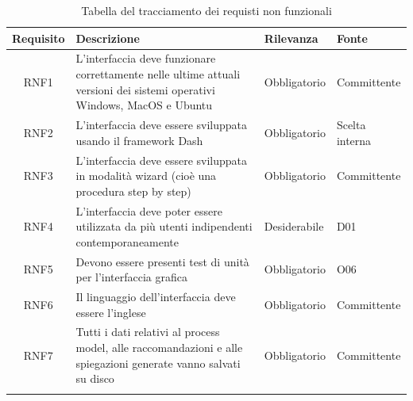 \begin{longtable}{cp{8cm}ll}
\hline
\hline
\textbf{Requisito} & \textbf{Descrizione} &  \textbf{Rilevanza} & \textbf{Fonte}\\
\hline
RNF1 & L'interfaccia deve funzionare correttamente nelle ultime attuali versioni dei sistemi operativi Windows, MacOS e Ubuntu & Obbligatorio & Committente \\
\hline
RNF2 & L'interfaccia deve essere sviluppata usando il framework Dash & Obbligatorio & Scelta interna \\
\hline
RNF3 & L'interfaccia deve essere sviluppata in modalità wizard (cioè una procedura step by step) & Obbligatorio & Committente \\
\hline
RNF4 & L'interfaccia deve poter essere utilizzata da più utenti indipendenti contemporaneamente & Desiderabile & D01 \\
\hline
RNF5 & Devono essere presenti test di unità per l'interfaccia grafica & Obbligatorio & O06 \\
\hline
RNF6 & Il linguaggio dell'interfaccia deve essere l'inglese & Obbligatorio & Committente \\
\hline
RNF7 & Tutti i dati relativi al process model, alle raccomandazioni e alle spiegazioni generate vanno salvati su disco & Obbligatorio & Committente \\

\hline
\hline
\caption{Tabella del tracciamento dei requisti non funzionali}
\end{longtable}